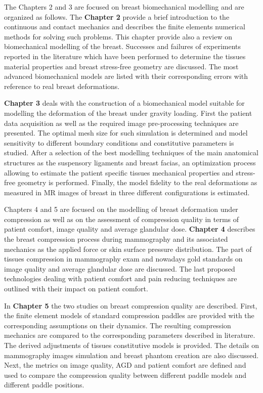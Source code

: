 The Chapters 2 and 3 are focused on breast biomechanical modelling and are organized as follows. The \textbf{Chapter 2} provide a brief introduction to the continuous and contact mechanics and describes the finite elements numerical methods for solving such problems.  This chapter provide also a review on biomechanical modelling of the breast. Successes and failures of experiments reported in the literature which have been performed to determine the tissues material properties and breast stress-free geometry are discussed. The most advanced biomechanical models are listed with their corresponding errors with reference to real breast deformations. 

\textbf{Chapter 3} deals with the construction of a biomechanical model suitable for modelling the
deformation of the breast under gravity loading. First the patient data acquisition as well as the required image pre-processing techniques are presented. The optimal mesh size for such simulation is determined and model sensitivity to different boundary conditions and constitutive parameters is studied. After a selection of the best modelling techniques of the main anatomical structures as the suspensory ligaments and breast facias, an optimization process allowing to estimate the patient specific tissues mechanical properties and stress-free geometry is performed.
Finally, the model fidelity to the real deformations as measured in MR images of breast in three different configurations is estimated.

Chapters 4 and 5 are focused on the modelling of breast deformation under compression as well as on the assessment of compression quality in terms of patient comfort, image quality and average glandular dose.  \textbf{Chapter 4} describes the breast compression process during mammography and its associated mechanics as the applied force or skin surface pressure distribution. The part of tissues compression in mammography exam and nowadays gold standards on image quality and average glandular dose are discussed. The last proposed technologies dealing with patient comfort and pain reducing techniques are outlined with their impact on patient comfort.      

In \textbf{Chapter 5} the two studies on breast compression quality are described. First, the finite element models of standard compression paddles are provided with the corresponding assumptions on their dynamics. The resulting compression mechanics are compared to the corresponding parameters described in literature. The derived adjustments of tissues constitutive models is provided. The details on mammography images simulation and breast phantom creation are also discussed. Next, the metrics on image quality, AGD and patient comfort are defined and used to compare the compression quality between different paddle models and different paddle positions. 
 
